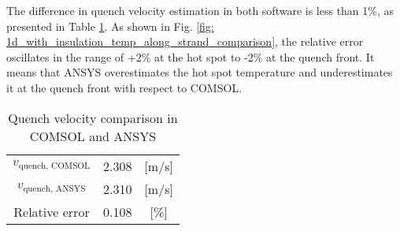 The difference in quench velocity estimation in both software is less than 1\%, as presented in Table \ref{table: 1d_with_insulation_v_quench_comparison}. As shown in Fig. \ref{fig: 1d_with_insulation_temp_along_strand_comparison}, the relative error oscillates in the range of +2\% at the hot spot to -2\% at the quench front. It means that ANSYS overestimates the hot spot temperature and underestimates it at the quench front with respect to COMSOL.

\begin{table}[h!]
    \caption{Quench velocity comparison in COMSOL and ANSYS} 
    \vspace{-1.em} 
    \fontsize{10}{10}
    \selectfont 
    \renewcommand{\arraystretch}{1.5}
    \begin{center}
        \begin{tabular}{ ccc }  
        \hline
        $v_\text{quench, COMSOL}$ & 2.308 & [m/s] \\
        $v_\text{quench, ANSYS}$ & 2.310 & [m/s] \\
        Relative error & 0.108 & [\%] \\
        \hline 
        \end{tabular}
    \end{center}  
     \label{table: 1d_with_insulation_v_quench_comparison} 
 \end{table}

